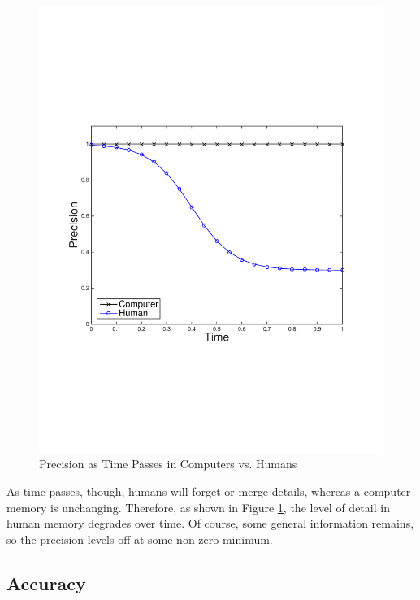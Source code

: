 
\begin{figure}
\begin{centering}
    \includegraphics[clip=true, trim = 15mm 65mm 25mm 70mm, scale=0.40]{figures/example_qoi_trends/prec_vs_time_hvc_1.pdf}
    \caption{Precision as Time Passes in Computers vs. Humans }
    \label{fig:prec_vs_time_hvc}
\end{centering}
\end{figure}

As time passes, though, humans will forget or merge details, whereas a computer memory is unchanging.  Therefore, as shown in Figure \ref{fig:prec_vs_time_hvc}, the level of detail in human memory degrades over time.  Of course, some general information remains, so the precision levels off at some non-zero minimum.

\subsection{Accuracy}

